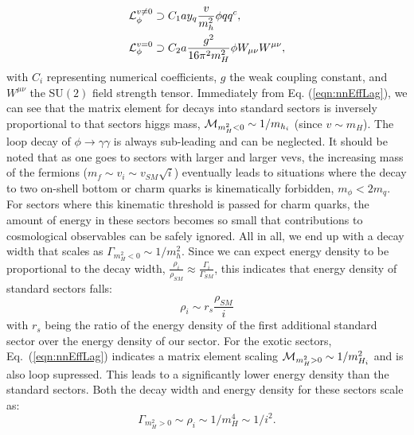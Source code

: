 \documentclass[nofootinbib,twocolumn,preprintnumbers]{revtex4-1}
\begin{document}
\begin{equation}\label{eqn:nnEffLag}
\begin{split}
{\cal L}_\phi^{v \neq 0} &\supset C_1 a y_q\frac{v}{m_h^2}\phi q q^c,
\\
{\cal L}_\phi^{v = 0} &\supset C_2 a \frac{g^2}{16\pi^2 m_H^2}\phi W_{\mu\nu}W^{\mu\nu},
\end{split}
\end{equation}
with $C_i$ representing numerical coefficients, $g$ the weak coupling constant, and $W^{\mu\nu}$ the SU$(2)$ field strength tensor.
Immediately from Eq. (\ref{eqn:nnEffLag}), we can see that the matrix element for decays into standard sectors is inversely proportional to that sectors higgs mass, ${\cal M}_{m_H^2 < 0} \sim 1/m_{h_i}$ (since $v\sim m_H$). 
The loop decay of $\phi \rightarrow \gamma\gamma$ is always sub-leading and can be neglected. It should be noted that as one goes to sectors with larger and larger vevs, the increasing mass of the fermions ($m_f \sim v_i \sim v_{SM}\sqrt{i}$) eventually leads to situations where the decay to two on-shell bottom or charm quarks is kinematically forbidden, $m_\phi < 2 m_q$. For sectors where this kinematic threshold is passed for charm quarks, the amount of energy in these sectors becomes so small that contributions to cosmological observables can be safely ignored. All in all, we end up with a decay width that scales as $\Gamma_{m_H^2<0} \sim 1/m_h^2$. Since we can expect energy density to be proportional to the decay width, $\frac{\rho_i}{\rho_{SM}} \approx \frac{\Gamma_i}{\Gamma_{SM}}$, this indicates that energy density of standard sectors falls:
\begin{equation}\label{eqn:edSS}
\rho_i \sim r_{s}\frac{\rho_{SM}}{i}
\end{equation} 
with $r_s$ being the ratio of the energy density of the first additional standard sector over the energy density of our sector.
For the exotic sectors, Eq.~(\ref{eqn:nnEffLag}) indicates a matrix element scaling ${\cal M}_{m_H^2>0} \sim 1/m_{H_i}^2$ and is also loop supressed. 
This leads to a significantly lower energy density than the standard sectors. Both the decay width and energy density for these sectors scale as: 
\begin{equation}
\Gamma_{m_H^2>0} \sim \rho_i \sim 1/m_H^4 \sim 1/i^2.
\label{eq:reheat_exotic}
\end{equation} 
\end{document}
